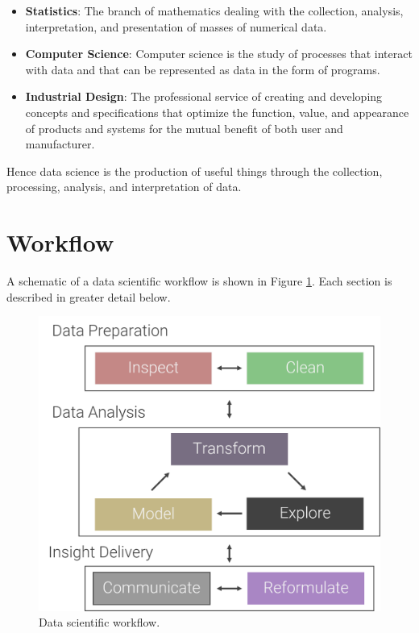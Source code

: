 \documentclass[
]{book}
\providecommand{\tightlist}{%
  \setlength{\itemsep}{0pt}\setlength{\parskip}{0pt}}
\begin{document}
\begin{itemize}
\tightlist
\item
  \textbf{Statistics}: The branch of mathematics dealing with the collection, analysis, interpretation, and presentation of masses of numerical data.
\item
  \textbf{Computer Science}: Computer science is the study of processes that interact with data and that can be represented as data in the form of programs.
\item
  \textbf{Industrial Design}: The professional service of creating and developing concepts and specifications that optimize the function, value, and appearance of products and systems for the mutual benefit of both user and manufacturer.
\end{itemize}

Hence data science is the production of useful things through the collection, processing, analysis, and interpretation of data.

\hypertarget{workflow}{%
\section{Workflow}\label{workflow}}

A schematic of a data scientific workflow is shown in Figure \ref{fig:ds-workflow}. Each section is described in greater detail below.

\begin{figure}

{\centering \includegraphics[width=17.54in]{images/data_science_workflow} 

}

\caption{Data scientific workflow.}\label{fig:ds-workflow}
\end{figure}
\end{document}
